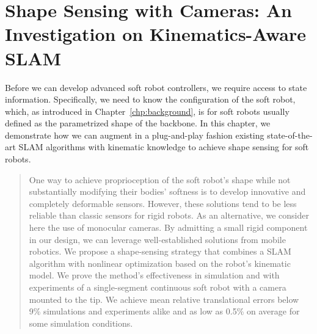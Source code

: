 \chapter{Shape Sensing with Cameras: An Investigation on Kinematics-Aware SLAM}
\label{chp:srslam}

\begin{foreword}
    Before we can develop advanced soft robot controllers, we require access to state information. Specifically, we need to know the configuration of the soft robot, which, as introduced in Chapter~\ref{chp:background}, is for soft robots usually defined as the parametrized shape of the backbone.
    In this chapter, we demonstrate how we can augment in a plug-and-play fashion existing state-of-the-art \gls{SLAM} algorithms with kinematic knowledge to achieve shape sensing for soft robots.
\end{foreword}

\begin{abstract}
    One way to achieve proprioception of the soft robot's shape while not substantially modifying their bodies' softness is to develop innovative and completely deformable sensors. 
    However, these solutions tend to be less reliable than classic sensors for rigid robots. As an alternative, we consider here the use of monocular cameras. By admitting a small rigid component in our design, we can leverage well-established solutions from mobile robotics. We propose a shape-sensing strategy that combines a SLAM algorithm with nonlinear optimization based on the robot's kinematic model. We prove the method's effectiveness in simulation and with experiments of a single-segment continuous soft robot with a camera mounted to the tip. We achieve mean relative translational errors below 9\% simulations and experiments alike and as low as 0.5\% on average for some simulation conditions.
\end{abstract}



